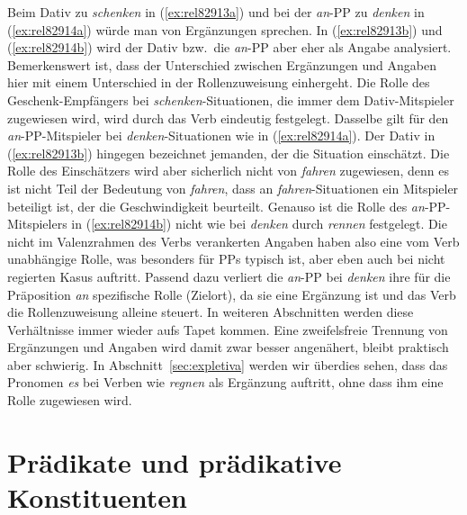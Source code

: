 Beim Dativ zu \textit{schenken} in (\ref{ex:rel82913a}) und bei der \textit{an}-PP zu \textit{denken} in (\ref{ex:rel82914a}) würde man von Ergänzungen sprechen.
In (\ref{ex:rel82913b}) und (\ref{ex:rel82914b}) wird der Dativ bzw.\ die \textit{an}-PP aber eher als Angabe analysiert.
Bemerkenswert ist, dass der Unterschied zwischen Ergänzungen und Angaben hier mit einem Unterschied in der Rollenzuweisung einhergeht.
Die Rolle des Geschenk-Empfängers bei \textit{schenken}-Situationen, die immer dem Dativ-Mitspieler zugewiesen wird, wird durch das Verb eindeutig festgelegt.
Dasselbe gilt für den \textit{an}-PP-Mitspieler bei \textit{denken}-Situationen wie in (\ref{ex:rel82914a}).
Der Dativ in (\ref{ex:rel82913b}) hingegen bezeichnet jemanden, der die Situation einschätzt.
Die Rolle des Einschätzers wird aber sicherlich nicht von \textit{fahren} zugewiesen, denn es ist nicht Teil der Bedeutung von \textit{fahren}, dass an \textit{fahren}-Situationen ein Mitspieler beteiligt ist, der die Geschwindigkeit beurteilt.
Genauso ist die Rolle des \textit{an}-PP-Mitspielers in (\ref{ex:rel82914b}) nicht wie bei \textit{denken} durch \textit{rennen} festgelegt.
Die nicht im Valenzrahmen des Verbs verankerten Angaben haben also eine vom Verb unabhängige Rolle, was besonders für PPs typisch ist, aber eben auch bei nicht regierten Kasus auftritt.
Passend dazu verliert die \textit{an}-PP bei \textit{denken} ihre für die Präposition \textit{an} spezifische Rolle (Zielort), da sie eine Ergänzung ist und das Verb die Rollenzuweisung alleine steuert.
In weiteren Abschnitten werden diese Verhältnisse immer wieder aufs Tapet kommen.
Eine zweifelsfreie Trennung von Ergänzungen und Angaben wird damit zwar besser angenähert, bleibt praktisch aber schwierig.
In Abschnitt~\ref{sec:expletiva} werden wir überdies sehen, dass das Pronomen \textit{es} bei Verben wie \textit{regnen} als Ergänzung auftritt, ohne dass ihm eine Rolle zugewiesen wird.




\section{Prädikate und prädikative Konstituenten}

\label{sec:praedikat}


